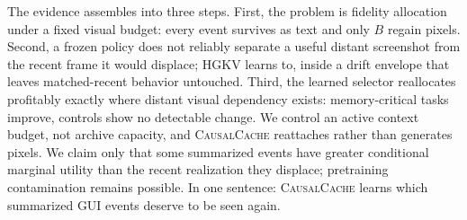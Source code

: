\documentclass[letterpaper]{article} %
\newcommand{\method}{\textsc{CausalCache}}
\newcommand{\hgkv}{\textsc{HGKV}}
\begin{document}
The evidence assembles into three steps. First, the problem is fidelity
allocation under a fixed visual budget: every event survives as text and
only $B$ regain pixels.
Second, a frozen policy does not reliably separate a useful distant
screenshot from the recent frame it would displace; \hgkv{} learns to,
inside a drift envelope that leaves matched-recent behavior untouched.
Third, the learned selector reallocates profitably exactly where distant
visual dependency exists: memory-critical tasks improve, controls show no
detectable change.
We control an active context budget, not archive capacity, and
\method{} reattaches rather than generates pixels. We claim only that
some summarized events have greater conditional marginal utility than
the recent realization they displace; pretraining contamination remains
possible. In one sentence: \method{} learns
which summarized GUI events deserve to be seen again.

\clearpage

\end{document}
